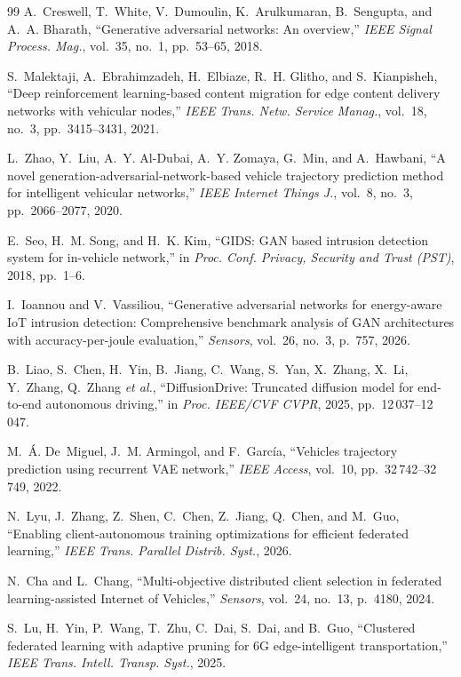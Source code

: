 \documentclass[journal]{IEEEtran}
\begin{document}
\begin{thebibliography}{99}
A.~Creswell, T.~White, V.~Dumoulin, K.~Arulkumaran, B.~Sengupta, and A.~A.
Bharath, ``Generative adversarial networks: An overview,'' \emph{IEEE Signal
Process. Mag.}, vol.~35, no.~1, pp.~53--65, 2018.

S.~Malektaji, A.~Ebrahimzadeh, H.~Elbiaze, R.~H. Glitho, and S.~Kianpisheh,
``Deep reinforcement learning-based content migration for edge content delivery
networks with vehicular nodes,'' \emph{IEEE Trans. Netw. Service Manag.},
vol.~18, no.~3, pp.~3415--3431, 2021.

L.~Zhao, Y.~Liu, A.~Y. Al-Dubai, A.~Y. Zomaya, G.~Min, and A.~Hawbani, ``A
novel generation-adversarial-network-based vehicle trajectory prediction method
for intelligent vehicular networks,'' \emph{IEEE Internet Things J.}, vol.~8,
no.~3, pp.~2066--2077, 2020.

E.~Seo, H.~M. Song, and H.~K. Kim, ``GIDS: GAN based intrusion detection system
for in-vehicle network,'' in \emph{Proc. Conf. Privacy, Security and Trust
(PST)}, 2018, pp.~1--6.

I.~Ioannou and V.~Vassiliou, ``Generative adversarial networks for energy-aware
IoT intrusion detection: Comprehensive benchmark analysis of GAN architectures
with accuracy-per-joule evaluation,'' \emph{Sensors}, vol.~26, no.~3, p.~757,
2026.

B.~Liao, S.~Chen, H.~Yin, B.~Jiang, C.~Wang, S.~Yan, X.~Zhang, X.~Li,
Y.~Zhang, Q.~Zhang \emph{et al.}, ``DiffusionDrive: Truncated diffusion model
for end-to-end autonomous driving,'' in \emph{Proc. IEEE/CVF CVPR}, 2025,
pp.~12\,037--12\,047.

M.~\'{A}. De~Miguel, J.~M. Armingol, and F.~Garc\'{i}a, ``Vehicles trajectory
prediction using recurrent VAE network,'' \emph{IEEE Access}, vol.~10,
pp.~32\,742--32\,749, 2022.

N.~Lyu, J.~Zhang, Z.~Shen, C.~Chen, Z.~Jiang, Q.~Chen, and M.~Guo, ``Enabling
client-autonomous training optimizations for efficient federated learning,''
\emph{IEEE Trans. Parallel Distrib. Syst.}, 2026.

N.~Cha and L.~Chang, ``Multi-objective distributed client selection in
federated learning-assisted Internet of Vehicles,'' \emph{Sensors}, vol.~24,
no.~13, p.~4180, 2024.

S.~Lu, H.~Yin, P.~Wang, T.~Zhu, C.~Dai, S.~Dai, and B.~Guo, ``Clustered
federated learning with adaptive pruning for 6G edge-intelligent
transportation,'' \emph{IEEE Trans. Intell. Transp. Syst.}, 2025.


\end{thebibliography}
\end{document}
